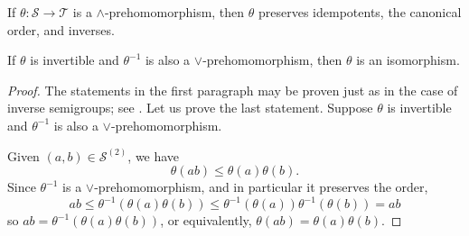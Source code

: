 \begin{proposition}\label{prop:invertiblelorprehomarehom}
If $\theta\colon\mathcal{S}\to\mathcal{T}$ is a $\land$-prehomomorphism, then $\theta$ preserves idempotents, the canonical order, and inverses.

If $\theta$ is invertible and $\theta^{-1}$ is also a $\lor$-prehomomorphism, then $\theta$ is an isomorphism.
\end{proposition}
\begin{proof}
    The statements in the first paragraph may be proven just as in the case of inverse semigroups; see \cite[Proposition 3.1.5]{MR1694900}. Let us prove the last statement. Suppose $\theta$ is invertible and $\theta^{-1}$ is also a $\lor$-prehomomorphism.
    
    Given $(a,b)\in\mathcal{S}^{(2)}$, we have
    \[\theta(ab)\leq\theta(a)\theta(b).\]
    Since $\theta^{-1}$ is a $\lor$-prehomomorphism, and in particular it preserves the order,
    \[ab\leq\theta^{-1}(\theta(a)\theta(b))\leq\theta^{-1}(\theta(a))\theta^{-1}(\theta(b))=ab\]
    so $ab=\theta^{-1}(\theta(a)\theta(b))$, or equivalently, $\theta(ab)=\theta(a)\theta(b)$.\qedhere
\end{proof}

